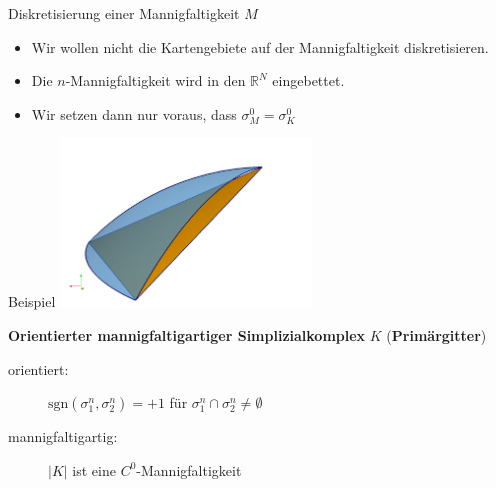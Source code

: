 \documentclass{beamer}
\newcommand{\R}{\mathds{R}}
\newcommand{\sgn}{\text{sgn}}
\begin{document}
  \begin{frame}
    \begin{block}{Diskretisierung einer Mannigfaltigkeit \( M \)}
      \begin{itemize}
        \item Wir wollen nicht die Kartengebiete auf der Mannigfaltigkeit diskretisieren.
        \item Die \( n \)-Mannigfaltigkeit wird in den \( \R^{N} \) eingebettet.
        \item Wir setzen dann nur voraus, dass \( \sigma^{0}_{M} = \sigma^{0}_{K} \)
      \end{itemize}
    \end{block}
    \begin{block}{Beispiel}
      \centering\includegraphics[width=0.5\textwidth]{bilder/paraview/abstractSimplex.png}
    \end{block}
  \end{frame}

  \begin{frame}
    \begin{block}{\textbf{Orientierter mannigfaltigartiger Simplizialkomplex} \( K \) (\textbf{Primärgitter})}
      \begin{description}
        \item[orientiert:] \( \sgn(\sigma^{n}_{1}, \sigma^{n}_{2}) = +1 \) für \( \sigma^{n}_{1} \cap \sigma^{n}_{2} \ne \emptyset \)
        \item[mannigfaltigartig:] \( |K| \) ist eine \( C^{0} \)-Mannigfaltigkeit
      \end{description}
    \end{block}
  \end{frame}
 
\end{document}
